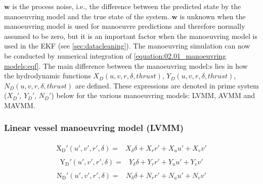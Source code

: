 \(\mathbf{w}\) is the process noise, i.e., the difference between the predicted state by the manoeuvring model and the true
state of the system. \(\mathbf{w}\) is unknown when the manoeuvring model is used for manoeuvre predictions and therefore normally
assumed to be zero, but it is an important factor when the manoeuvring model is used in the EKF (see \autoref{sec:datacleaning}).
The manoeuvring simulation can now be conducted by numerical integration of \autoref{equation:02.01_manoeuvring models:eqf}. The main difference between the manoeuvring model:s lies in how the hydrodynamic functions \(X_D(u,v,r,\delta,thrust)\), \(Y_D(u,v,r,\delta,thrust)\), \(N_D(u,v,r,\delta,thrust)\) are defined. These expressions are denoted in prime system ($X_D'$, $Y_D'$, $N_D'$) below for the various manoeuvring models: LVMM, AVMM and MAVMM.

\subsubsection*{{\normalfont \textbf{Linear vessel manoeuvring model (LVMM) \cite{matusiak_dynamics_2021}}}}
\begin{equation}\label{equation:02.01_manoeuvring models:eqxlinear}
\begin{split}\begin{split}
\operatorname{X_{D}'}{\left(u',v',r',\delta\right)} = & X_{\delta} \delta + X_{r} r' + X_{u} u' + X_{v} v' 
\end{split}\end{split}
\end{equation}\begin{equation}\label{equation:02.01_manoeuvring models:eqylinear}
\begin{split}\begin{split}
\operatorname{Y_{D}'}{\left(u',v',r',\delta \right)} = & Y_{\delta} \delta + Y_{r} r' + Y_{u} u' + Y_{v} v' 
\end{split}\end{split}
\end{equation}\begin{equation}\label{equation:02.01_manoeuvring models:eqnlinear}
\begin{split}\begin{split}
\operatorname{N_{D}'}{\left(u',v',r',\delta \right)} = & N_{\delta} \delta + N_{r} r' + N_{u} u' + N_{v} v' 
\end{split}\end{split}
\end{equation}
\sphinxAtStartPar
